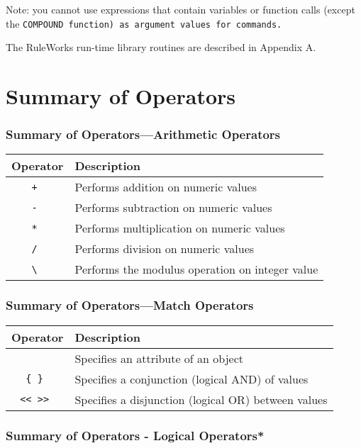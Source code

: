 Note: you cannot use expressions that contain variables or function
calls (except the \tt{COMPOUND} function) as argument values for
commands.

The RuleWorks run-time library routines are described in Appendix A.

\section{Summary of Operators}

\subsubsection{Summary of Operators---Arithmetic Operators}

\begin{tabularx}{\columnwidth}{cX}
  \toprule
  Operator & Description \\
  \midrule
  \tt{+} & Performs addition on numeric values \\
  \tt{-} & Performs subtraction on numeric values \\
  \tt{*} & Performs multiplication on numeric values \\
  \tt{/} & Performs division on numeric values \\
  \tt{\textbackslash} & Performs the modulus operation on integer value \\
  \bottomrule
\end{tabularx}

\subsubsection{Summary of Operators---Match Operators}

\begin{tabularx}{\columnwidth}{cX}
  \toprule
  Operator & Description \\
  \midrule
  \ct & Specifies an attribute of an object \\
  \tt{\{} \tt{\}} & Specifies a conjunction (logical AND) of values \\
  \tt{<<} \tt{>>} & Specifies a disjunction (logical OR)
                    between values \\
  \bottomrule
\end{tabularx}
  
\subsubsection{Summary of Operators - Logical Operators*}

